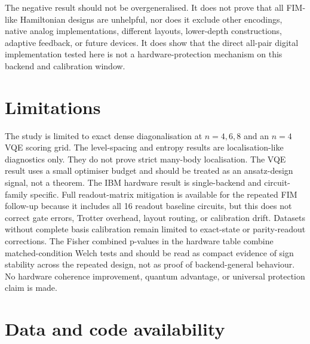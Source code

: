 \documentclass[preprint,aps,physrev,superscriptaddress,floatfix,longbibliography]{revtex4-2}
\begin{document}
The negative result should not be overgeneralised. It does not prove that all
FIM-like Hamiltonian designs are unhelpful, nor does it exclude other encodings,
native analog implementations, different layouts, lower-depth constructions,
adaptive feedback, or future devices. It does show that the direct all-pair
digital implementation tested here is not a hardware-protection mechanism on
this backend and calibration window.

\section{Limitations}

The study is limited to exact dense diagonalisation at $n=4,6,8$ and an
$n=4$ VQE scoring grid. The level-spacing and entropy results are
localisation-like diagnostics only. They do not prove strict many-body
localisation. The VQE result uses a small optimiser budget and should be treated
as an ansatz-design signal, not a theorem. The IBM hardware result is
single-backend and circuit-family specific. Full readout-matrix mitigation is
available for the repeated FIM follow-up because it includes all 16 readout
baseline circuits, but this does not correct gate errors, Trotter overhead,
layout routing, or calibration drift. Datasets without complete basis
calibration remain limited to exact-state or parity-readout corrections. The
Fisher combined p-values in the hardware table combine matched-condition Welch
tests and should be read as compact evidence of sign stability across the
repeated design, not as proof of backend-general behaviour. No hardware
coherence improvement, quantum advantage, or universal protection claim is
made.

\section{Data and code availability}
\end{document}
